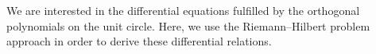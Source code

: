 \documentclass[12pt]{amsart}
\begin{document}

We are interested in the differential equations fulfilled by the orthogonal polynomials on the unit circle. Here, we use the Riemann--Hilbert problem approach in order to derive these differential relations.



\end{document}
